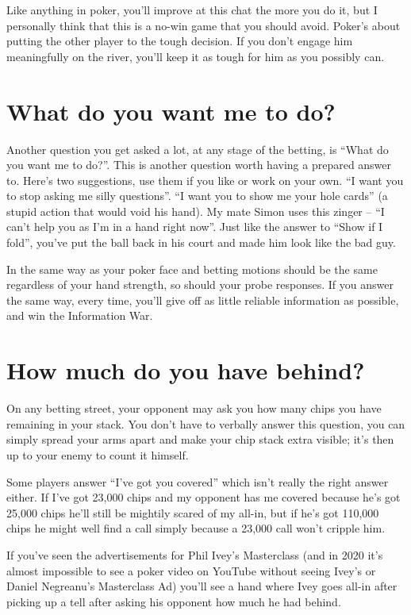 \begin{itemize}
    Like anything in poker, you'll improve at this chat the more you
    do it, but I personally think that this is a no-win game that you
    should avoid. Poker's about putting the other player to the tough
    decision. If you don't engage him meaningfully on the river,
    you'll keep it as tough for him as you possibly can.
    
\end{itemize}

\section{What do you want me to do?}

Another question you get asked a lot, at any stage of the betting, is
``What do you want me to do?''. This is another question worth having
a prepared answer to. Here's two suggestions, use them if you
like or work on your own. ``I want you to stop asking me silly
questions''. ``I want you to show me your hole cards'' (a stupid
action that would void his hand). My mate Simon uses
this zinger -- ``I can't help you as I'm in a hand right
now''. Just like the answer to ``Show if I fold'', you've put the
ball back in his court and made him look like the bad guy.

In the same way as your poker face and betting motions should be the
same regardless of your hand strength, so should your probe
responses. If you answer the same way, every time, you'll give off
as little reliable information as possible, and win the
Information War.

\section{How much do you have behind?}

On any betting street, your opponent may ask you how many chips
you have remaining in your stack. You don't have to verbally answer
this question, you can simply spread your arms apart and make your
chip stack extra visible; it's then up to your enemy to count it
himself.

Some players answer ``I've got you covered'' which isn't really the
right answer either. If I've got 23,000 chips and my opponent has me
covered because he's got 25,000 chips he'll still be mightily scared
of my all-in, but if he's got 110,000 chips he might well find a call
simply because a 23,000 call won't cripple him.

If you've seen the advertisements for Phil Ivey's Masterclass (and
in 2020 it's almost impossible to see a poker video on YouTube without
seeing Ivey's or Daniel Negreanu's Masterclass Ad) you'll see
a hand where Ivey goes all-in after picking up a tell after asking
his opponent how much he had behind.

